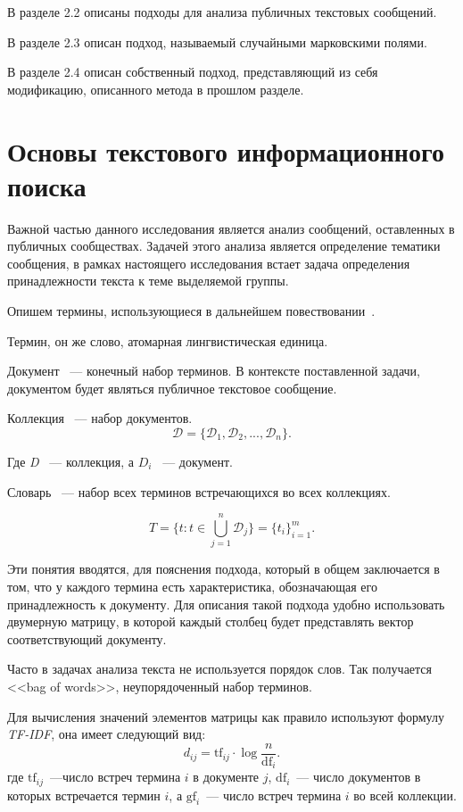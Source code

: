 \documentclass[annotation,times,page4]{itmo-student-thesis}
\begin{document}
В разделе 2.2 описаны подходы для анализа публичных текстовых сообщений.

В разделе 2.3 описан подход, называемый случайными марковскими полями.

В разделе 2.4 описан собственный подход, представляющий из себя модификацию, описанного метода в прошлом разделе. 
\section{Основы текстового информационного поиска}
Важной частью данного исследования является анализ сообщений, оставленных в публичных сообществах. Задачей этого анализа является определение тематики сообщения, в рамках настоящего исследования встает задача определения принадлежности текста к теме выделяемой группы. 

Опишем термины, использующиеся в дальнейшем повествовании~\cite{manning2008introduction}.  

Термин, он же слово, атомарная лингвистическая единица.

Документ ~--- конечный набор терминов. В контексте поставленной задачи, документом будет являться публичное текстовое сообщение.

Коллекция ~--- набор документов.
\[
    \mathcal{D} = \{\mathcal{D}_1, \mathcal{D}_2,...,\mathcal{D}_n\}.
\]
 
Где \textit{D} ~--- коллекция, а $D_{i}$ ~--- документ.

Словарь ~--- набор всех терминов встречающихся во всех коллекциях.

\[
    T = \{t \colon t \in \bigcup_{j=1}^{n} \mathcal{D}_j\} = \{t_i\}_{i=1}^{m}.
\]

Эти понятия вводятся, для пояснения подхода, который в общем заключается в том, что у каждого термина есть характеристика, обозначающая его принадлежность к документу. Для описания такой подхода удобно использовать двумерную матрицу, в которой каждый столбец будет представлять вектор соответствующий документу.

Часто в задачах анализа текста не используется порядок слов. Так получается <<bag of words>>, неупорядоченный набор терминов.

Для вычисления значений элементов матрицы как правило используют формулу \textit{ TF-IDF}, она имеет следующий вид: 
\begin{equation}\label{eq:tf_idf}
    d_{ij} = \mathrm{tf}_{ij} \cdot \log{\frac{n}{\mathrm{df}_{i}}}.
\end{equation} 
где $\mathrm{tf}_{ij}$~---число встреч термина $i$ в документе $j$, $\mathrm{df}_{i}$~---
число документов в которых встречается термин $i$, а $\mathrm{gf}_{i}$~---
число встреч термина $i$ во всей коллекции.
\end{document}
